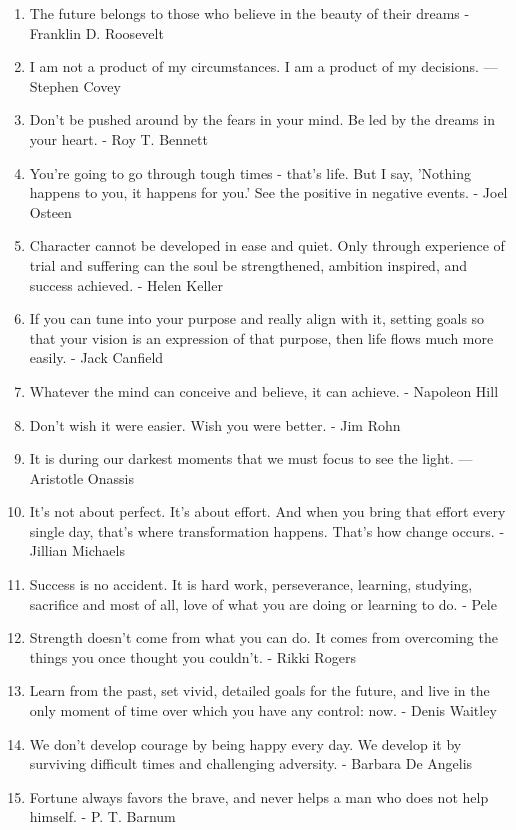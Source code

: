 \begin{enumerate}
            \item The future belongs to those who believe in the beauty of their dreams - Franklin D. Roosevelt
            \item I am not a product of my circumstances. I am a product of my decisions. — Stephen Covey
            \item Don’t be pushed around by the fears in your mind. Be led by the dreams in your heart. - Roy T. Bennett
            \item You're going to go through tough times - that's life. But I say, 'Nothing happens to you, it happens for you.' See the positive in negative events. - Joel Osteen
            \item Character cannot be developed in ease and quiet. Only through experience of trial and suffering can the soul be strengthened, ambition inspired, and success achieved. - Helen Keller
            \item If you can tune into your purpose and really align with it, setting goals so that your vision is an expression of that purpose, then life flows much more easily. - Jack Canfield
            \item Whatever the mind can conceive and believe, it can achieve. - Napoleon Hill
            \item Don’t wish it were easier. Wish you were better. - Jim Rohn
            \item It is during our darkest moments that we must focus to see the light. — Aristotle Onassis
            \item It's not about perfect. It's about effort. And when you bring that effort every single day, that's where transformation happens. That's how change occurs. - Jillian Michaels
            \item Success is no accident. It is hard work, perseverance, learning, studying, sacrifice and most of all, love of what you are doing or learning to do. - Pele
            \item Strength doesn’t come from what you can do. It comes from overcoming the things you once thought you couldn’t. - Rikki Rogers
            \item Learn from the past, set vivid, detailed goals for the future, and live in the only moment of time over which you have any control: now. - Denis Waitley
            \item We don’t develop courage by being happy every day. We develop it by surviving difficult times and challenging adversity. - Barbara De Angelis
            \item Fortune always favors the brave, and never helps a man who does not help himself. - P. T. Barnum

\end{enumerate}
